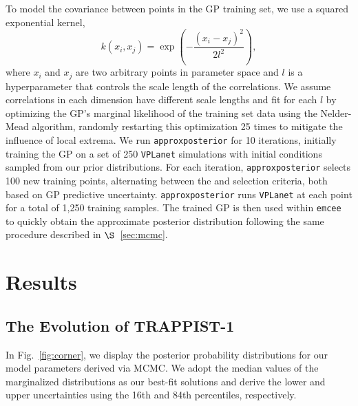 \documentclass[twocolumn]{aastex62}
\newcommand{\vplanet}[0]{\texttt{VPLanet}\xspace}
\newcommand{\emcee}[0]{\texttt{emcee}\xspace}
\newcommand{\approxposterior}[0]{\texttt{approxposterior}\xspace}
\begin{document}
To model the covariance between points in the GP training set, we use a squared exponential kernel,
\begin{equation} \label{eqn:kernel}
k(x_i, x_j) = \exp \left( - \frac{(x_i - x_j)^2}{2l^2} \right),
\end{equation}
where $x_i$ and $x_j$ are two arbitrary points in parameter space and $l$ is a hyperparameter that controls the scale length of the correlations. We assume correlations in each dimension have different scale lengths and fit for each $l$ by optimizing the GP's marginal likelihood of the training set data using the Nelder-Mead algorithm, randomly restarting this optimization 25 times to mitigate the influence of local extrema. We run \approxposterior for 10 iterations, initially training the GP on a set of 250 \vplanet simulations with initial conditions sampled from our prior distributions. For each iteration, \approxposterior selects 100 new training points, alternating between the \citet{Kandasamy2015} and \citet{Wang2017} selection criteria, both based on GP predictive uncertainty. \approxposterior runs \vplanet at each point for a total of 1,250 training samples. The trained GP is then used within \emcee to quickly obtain the approximate posterior distribution following the same procedure described in $\S$~\ref{sec:mcmc}.


\section{Results} \label{sec:results}

\subsection{The Evolution of TRAPPIST-1}

In Fig.~\ref{fig:corner}, we display the posterior probability distributions for our model parameters derived via MCMC. We adopt the median values of the marginalized distributions as our best-fit solutions and derive the lower and upper uncertainties using the 16th and 84th percentiles, respectively. 
\end{document}
